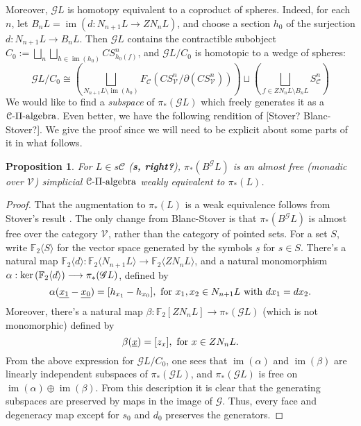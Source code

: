 \documentclass[11pt]{amsart}
\theoremstyle{plain}
\newtheorem{prop}[thm]{Proposition}
\theoremstyle{definition}
\renewcommand{\ker}{\textup{ker}\,}
\DeclareMathOperator{\im}{im}
\renewcommand{\to}{\longrightarrow}
\newcommand{\scrQ}{\mathscr{Q}}
\newcommand{\scrR}{\mathscr{R}}
\newcommand{\scrT}{\mathscr{T}}
\newcommand{\scrY}{\mathscr{Y}}
\newcommand{\scrI}{\mathscr{I}}
\newcommand{\scrO}{\mathscr{O}}
\newcommand{\scrP}{\mathscr{P}}
\newcommand{\scrS}{\mathscr{S}}
\newcommand{\scrG}{\mathscr{G}}
\newcommand{\scrH}{\mathscr{H}}
\newcommand{\scrJ}{\mathscr{J}}
\newcommand{\scrK}{\mathscr{K}}
\newcommand{\scrL}{\mathscr{L}}
\newcommand{\scrZ}{\mathscr{Z}}
\newcommand{\scrN}{\mathscr{N}}
\newcommand{\scrM}{\mathscr{M}}
\newcommand{\calC}{\mathcal{C}}
\newcommand{\calV}{\mathcal{V}}
\theoremstyle{plain}
\newcommand{\vect}[2]{\calV^{#1}_{#2}}
\newcommand{\BSW}{{\scrG}}%
\newcommand{\F}{\mathbb{F}}
\begin{document}
\begin{Composite functor spectral sequences}
Moreover, $\BSW L$ is homotopy equivalent to a coproduct of spheres. Indeed, for each $n$, let $B_nL=\im (d:N_{n+1}L\to ZN_nL)$, and choose a section $h_0$ of the surjection $d:N_{n+1}L\to B_nL$. Then $\BSW L$ contains the contractible subobject $C_0:=\bigsqcup_n\bigsqcup_{h\in \im (h_0)} CS^n_{h_0(f)}$, and $\BSW L/C_0$ is homotopic to a wedge of spheres:
\[\BSW L/C_0\cong \left(\bigsqcup_{N_{n+1}L\setminus\im (h_0)}F_\calC (CS^n_{\vect{}{}}/\partial(CS^n_{\vect{}{}}))\right) \sqcup\left(\bigsqcup_{f\in ZN_nL\setminus B_nL}S^n_\calC\right)\]
We would like to find a \emph{subspace} of $\pi_*(\BSW L)$ which freely generates it as a $\calC\textup{-$\Pi$-algebra}$. Even better, we have the following rendition of [Stover? Blanc-Stover?]. We give the proof since we will need to be explicit about some parts of it in what follows.
\begin{prop}
For $L\in s\calC$ (\textbf{s, right?}), $\pi_*(B^{\BSW}L)$ is an almost free (monadic over $\vect{}{}$) simplicial $\calC\textup{-$\Pi$-algebra}$ weakly equivalent to $\pi_*(L)$.
\end{prop}
\begin{proof}
That the augmentation to $\pi_*(L)$ is a weak equivalence follows from Stover's result \cite[2.7]{StoverVanKampen.pdf}. The only change from Blanc-Stover is that $\pi_*(B^{\BSW}L)$ is almost free over the category $\vect{}{}$, rather than the category of pointed sets.
For a set $S$, write $\F_2\langle S\rangle$ for the vector space generated by the symbols $\underline{s}$ for $s\in S$. There's a natural map $\F_2\langle d\rangle :\F_2\langle N_{n+1}L\rangle \to \F_2\langle ZN_nL\rangle $, and a natural monomorphism $\alpha:\ker(\F_2\langle d\rangle)\to \pi_*(\BSW L)$, defined by
\[\alpha(\underline{x_1}-\underline{x_0})=[h_{x_1}-h_{x_0}],\textup{ for $x_1,x_2\in N_{n+1}L$ with $dx_1=dx_2$}.\]
Moreover, there's a natural map $\beta:\F_2[ZN_nL]\to\pi_*(\BSW L)$ (which is not monomorphic) defined by
\[\beta(\underline{x})=[z_{x}],\textup{ for $x\in ZN_{n}L$}.\]
From the above expression for $\BSW L/C_0$, one sees that $\im (\alpha)$ and $\im (\beta)$ are linearly independent subspaces of $\pi_*(\BSW L)$, and $\pi_*(\BSW L)$ is free on $\im (\alpha)\oplus\im (\beta)$. From this description it is clear that the generating subspaces are preserved by maps in the image of $\BSW $. Thus, every face and degeneracy map except for $s_0$ and $d_0$ preserves the generators.


\end{proof}
\end{Composite functor spectral sequences}
\end{document}
